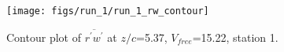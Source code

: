 \begin{figure}[H]
\centering
\texttt{[image: figs/run\_1/run\_1\_rw\_contour]}
\caption{Contour plot of $\overline{r^\prime w^\prime}$ at $z/c$=5.37, $V_{free}$=15.22, station 1.}
\label{fig:run_1_rw_contour}
\end{figure}


